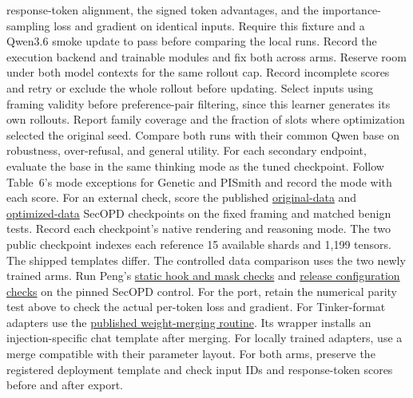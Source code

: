 \documentclass[11pt]{article}
\begin{document}
response-token alignment, the signed token advantages, and the importance-sampling loss and gradient on identical inputs. Require this fixture and a Qwen3.6 smoke update to pass before comparing the local runs. Record the execution backend and trainable modules and fix both across arms. Reserve room under both model contexts for the same rollout cap. Record incomplete scores and retry or exclude the whole rollout before updating. Select inputs using framing validity before preference-pair filtering, since this learner generates its own rollouts. Report family coverage and the fraction of slots where optimization selected the original seed. Compare both runs with their common Qwen base on robustness, over-refusal, and general utility. For each secondary endpoint, evaluate the base in the same thinking mode as the tuned checkpoint. Follow Table~6's mode exceptions for Genetic and PISmith and record the mode with each score. For an external check, score the published \href{https://huggingface.co/pybbb/Qwen3.6-27B-SecOPD/tree/7d15491c5c29a489f4f09be2d19d0ecce7cf1164}{original-data} and \href{https://huggingface.co/Sizhe-Chen/Qwen3.6-27B-Thinking-SecOPD/tree/48bebe2adfc7dddb60f6d35526844aaf96b22b3d}{optimized-data} SecOPD checkpoints on the fixed framing and matched benign tests. Record each checkpoint's native rendering and reasoning mode. The two public checkpoint indexes each reference 15 available shards and 1,199 tensors. The shipped templates differ. The controlled data comparison uses the two newly trained arms. Run Peng's \href{https://github.com/pppyb/SecOPD/blob/571502a2a315c4b8820dd878d4569e2a2222cb88/tests/test_full_kl_contract.py}{static hook and mask checks} and \href{https://github.com/pppyb/SecOPD/blob/571502a2a315c4b8820dd878d4569e2a2222cb88/tests/test_release_configs.py}{release configuration checks} on the pinned SecOPD control. For the port, retain the numerical parity test above to check the actual per-token loss and gradient. For Tinker-format adapters use the \href{https://github.com/pppyb/SecOPD/blob/571502a2a315c4b8820dd878d4569e2a2222cb88/scripts/merge_tinker_checkpoint.py}{published weight-merging routine}. Its wrapper installs an injection-specific chat template after merging. For locally trained adapters, use a merge compatible with their parameter layout. For both arms, preserve the registered deployment template and check input IDs and response-token scores before and after export.
\end{document}

